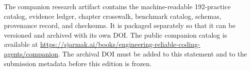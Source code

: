 The companion research artifact contains the machine-readable 192-practice catalog, evidence ledger, chapter crosswalk, benchmark catalog, schemas, provenance record, and checksums. It is packaged separately so that it can be versioned and archived with its own DOI. The public companion catalog is available at \url{https://sjarmak.ai/books/engineering-reliable-coding-agents/companion}. The archival DOI must be added to this statement and to the submission metadata before this edition is frozen.
